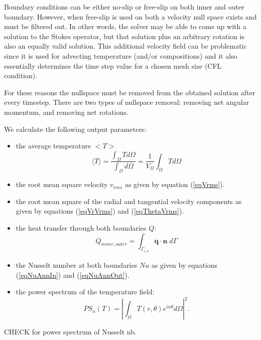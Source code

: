 Boundary conditions can be either no-slip or free-slip on both inner and outer boundary. However, when free-slip 
is used on both a velocity null space exists and must be filtered out. In other words,
the solver may be able to come up with a solution to the Stokes operator, but 
that solution plus an arbitrary rotation is also an equally valid solution.
This additional velocity field can be problematic since it is used for advecting temperature (and/or compositions)
and it also essentially determines the time step value for a chosen mesh size (CFL condition).

For these reasons the nullspace must be removed from the obtained solution after every timestep.
There are two types of nullspace removal: removing net angular momentum, and removing net rotations.




We calculate the following output parameters: 
\begin{itemize}
\item the average temperature $<T>$
\begin{equation}
\langle T \rangle = \frac{\int_\Omega T  d\Omega }{\int_\Omega d \Omega }
=\frac{1}{V_\Omega}\int_\Omega T d\Omega
\end{equation}
\item the root mean square velocity $v_{rms}$ as given by equation (\ref{eqVrms}).
\item the root mean square of the radial and tangential velocity components as given by equations (\ref{eqVrVrms}) and (\ref{eqThetaVrms}).
\item the heat transfer through both boundaries $Q$:
\begin{equation}
Q_{inner, outer} = \int_{\Gamma_{i,o}} \boldsymbol{q} \cdot \boldsymbol{{n}} \; d\Gamma 
\end{equation}
\item the Nusselt number at both boundaries $Nu$ as given by equations (\ref{eqNuAnnIn}) and  (\ref{eqNuAnnOut}). 
\item the power spectrum of the temperature field:
\begin{equation}
PS_n(T) = \left |\int_\Omega T(r, \theta) e^{in\theta} d\Omega \right |^2.
\end{equation}
\end{itemize}


CHECK \cite{brha09} for power spectrum of Nusselt nb.



